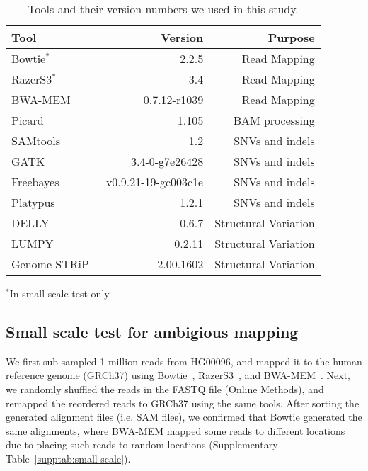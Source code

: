\documentclass[10pt,a4paper]{article}
\begin{document}
\begin{table}[htb]
\caption{Tools and their version numbers we used in this study.}
\begin{center}
\begin{tabular}{|l|r|r|}
\hline
{\bf Tool} & {\bf Version} & {\bf Purpose}\\
\hline
Bowtie$^*$~\cite{Langmead2009} & 2.2.5 & Read Mapping \\
RazerS3$^*$~\cite{Weese2012} & 3.4 & Read Mapping\\
BWA-MEM~\cite{Li2013} & 0.7.12-r1039 & Read Mapping\\
Picard~\cite{picard} & 1.105 & BAM processing\\
SAMtools~~\cite{Li2009b} & 1.2 & SNVs and indels\\
GATK~\cite{DePristo2011} & 3.4-0-g7e26428 & SNVs and indels\\
Freebayes~\cite{Garrison2012} & v0.9.21-19-gc003c1e & SNVs and indels\\
Platypus~\cite{Rimmer2014} & 1.2.1 & SNVs and indels\\
DELLY~\cite{Rausch2012} & 0.6.7 & Structural Variation\\
LUMPY~\cite{Layer2014} & 0.2.11 & Structural Variation\\
Genome STRiP~\cite{Handsaker2011,Handsaker2015} & 2.00.1602 & Structural Variation\\
\hline
\end{tabular}
\end{center}
    {\footnotesize $^*$In small-scale test only.}

\label{tab:tools}
\end{table}

\subsection*{Small scale test for ambigious mapping}
We first sub sampled 1 million reads from HG00096, and mapped it to the human reference genome (GRCh37) using Bowtie~\cite{Langmead2009}, RazerS3~\cite{Weese2012}, %
and BWA-MEM~\cite{Li2009a,Li2013}.
Next, we randomly shuffled the reads in the FASTQ file (Online Methods), and remapped the reordered reads to GRCh37 using the same tools.
After sorting the generated alignment files (i.e. SAM files), we confirmed that %
Bowtie generated the same alignments,
where BWA-MEM mapped some reads to different locations due to placing 
such reads to random locations (Supplementary Table~\ref{supptab:small-scale}).
\end{document}
